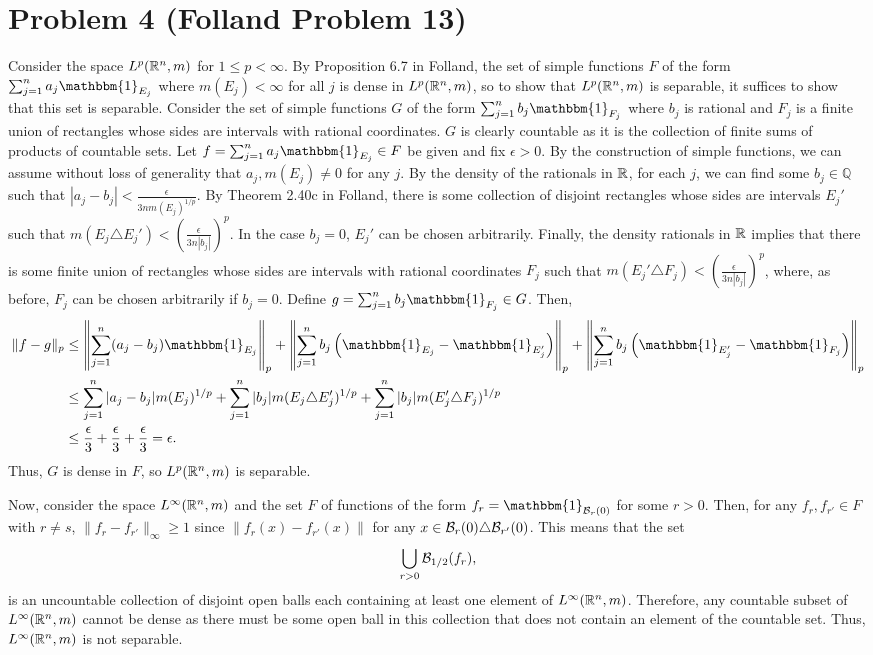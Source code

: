 \documentclass{article}
\begin{document}
\section{Problem 4 (Folland Problem 13)}
Consider the space $L^p(\mathbb{R}^n,m)$ for $1\leq p<\infty$. By Proposition 6.7 in Folland, the set of simple functions $F$ of the form $\sum_{j=1}^na_j\mathbbm{1}_{E_j}$ where $m(E_j)<\infty$ for all $j$ is dense in $L^p(\mathbb{R}^n,m)$, so to show that $L^p(\mathbb{R}^n,m)$ is separable, it suffices to show that this set is separable. Consider the set of simple functions $G$ of the form $\sum_{j=1}^nb_j\mathbbm{1}_{F_j}$ where $b_j$ is rational and $F_j$ is a finite union of rectangles whose sides are intervals with rational coordinates. $G$ is clearly countable as it is the collection of finite sums of products of countable sets. Let $f=\sum_{j=1}^na_j\mathbbm{1}_{E_j}\in F$ be given and fix $\epsilon>0$. By the construction of simple functions, we can assume without loss of generality that $a_j,m(E_j)\neq0$ for any $j$. By the density of the rationals in $\mathbb{R}$, for each $j$, we can find some $b_j\in\mathbb{Q}$ such that $|a_j-b_j|<\frac{\epsilon}{3nm(E_j)^{1/p}}$. By Theorem 2.40c in Folland, there is some collection of disjoint rectangles whose sides are intervals $E_j'$ such that $m(E_j\triangle E_j')<\left(\frac{\epsilon}{3n|b_j|}\right)^p$. In the case $b_j=0$, $E_j'$ can be chosen arbitrarily. Finally, the density rationals in $\mathbb{R}$ implies that there is some finite union of rectangles whose sides are intervals with rational coordinates $F_j$ such that $m(E_j'\triangle F_j)<\left(\frac{\epsilon}{3n|b_j|}\right)^p$, where, as before, $F_j$ can be chosen arbitrarily if $b_j=0$. Define $g=\sum_{j=1}^nb_j\mathbbm{1}_{F_j}\in G$. Then,
\begin{align*}
\|f-g\|_p&\leq\left\|\sum_{j=1}^n(a_j-b_j)\mathbbm{1}_{E_j}\right\|_p+\left\|\sum_{j=1}^nb_j\left(\mathbbm{1}_{E_j}-\mathbbm{1}_{E_j'}\right)\right\|_p+\left\|\sum_{j=1}^nb_j\left(\mathbbm{1}_{E_j'}-\mathbbm{1}_{F_j}\right)\right\|_p\\&\leq\sum_{j=1}^{n}|a_j-b_j|m(E_j)^{1/p}+\sum_{j=1}^{n}|b_j|m(E_j\triangle E_j')^{1/p}+\sum_{j=1}^{n}|b_j|m(E_j'\triangle F_j)^{1/p}\\&\leq
\frac{\epsilon}{3}+\frac{\epsilon}{3}+\frac{\epsilon}{3}=\epsilon.
\end{align*}
Thus, $G$ is dense in $F$, so $L^p(\mathbb{R}^n,m)$ is separable.

Now, consider the space $L^\infty(\mathbb{R}^n,m)$ and the set $F$ of functions of the form $f_r=\mathbbm{1}_{\cB_r(0)}$ for some $r>0$. Then, for any $f_r,f_{r'}\in F$ with $r\neq s$, $\|f_r-f_{r'}\|_\infty\geq1$ since $\|f_r(x)-f_{r'}(x)\|$ for any $x\in {\cal B}_r(0)\triangle{\cal B}_{r'}(0)$. This means that the set 
\[
\bigcup_{r>0}{\cal B}_{1/2}(f_r),
\]
is an uncountable collection of disjoint open balls each containing at least one element of $L^\infty(\mathbb{R}^n,m)$. Therefore, any countable subset of $L^\infty(\mathbb{R}^n,m)$ cannot be dense as there must be some open ball in this collection that does not contain an element of the countable set. Thus, $L^\infty(\mathbb{R}^n,m)$ is not separable.
\end{document}

